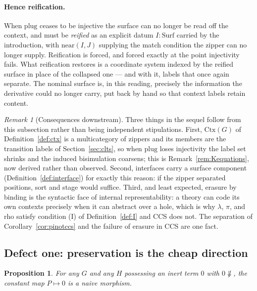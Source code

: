 \documentclass[11pt,a4paper]{article}
\theoremstyle{definition}
\theoremstyle{plain}
\newtheorem{proposition}[definition]{Proposition}
\theoremstyle{remark}
\newtheorem{remark}[definition]{Remark}
\newcommand{\Ctx}{\mathrm{Ctx}}
\newcommand{\obs}{\Downarrow}
\begin{document}
\paragraph{Hence reification.}
When $\mathrm{plug}$ ceases to be injective the surface can no longer be read off the
context, and must be \emph{reified} as an explicit datum $I : \mathrm{Surf}$ carried
by the introduction, with $\mathrm{near}(I,J)$ supplying the match condition the
zipper can no longer supply. Reification is forced, and forced exactly at the point
injectivity fails. What reification restores is a coordinate system indexed by the
reified surface in place of the collapsed one --- and with it, labels that once again
separate. The nominal surface is, in this reading, precisely the information the
derivative could no longer carry, put back by hand so that context labels retain
content.

\begin{remark}[Consequences downstream]
\label{rem:derivconseq}
Three things in the sequel follow from this subsection rather than being independent
stipulations. First, $\Ctx(G)$ of Definition~\ref{def:ctx} is a multicategory of
zippers and its members are the transition labels of Section~\ref{sec:clts}, so when
$\mathrm{plug}$ loses injectivity the label set shrinks and the induced bisimulation
coarsens; this is Remark~\ref{rem:Kequations}, now derived rather than observed. Second, interfaces
carry a surface component (Definition~\ref{def:interface}) for exactly this reason:
if the zipper separated positions, sort and stage would suffice. Third, and least
expected, erasure by binding is the syntactic face of internal representability:
a theory can code its own contexts precisely when it can abstract over a hole, which
is why $\lambda$, $\pi$, and rho satisfy condition (I) of
Definition~\ref{def:I} and CCS does not. The separation of
Corollary~\ref{cor:pinotccs} and the failure of erasure in CCS are one fact.
\end{remark}

\subsection{Defect one: preservation is the cheap direction}

\begin{proposition}
\label{prop:trivial}
For any $G$ and any $H$ possessing an inert term $0$ with $0 \not\obs$, the constant
map $P \mapsto 0$ is a naive morphism.
\end{proposition}
\end{document}
